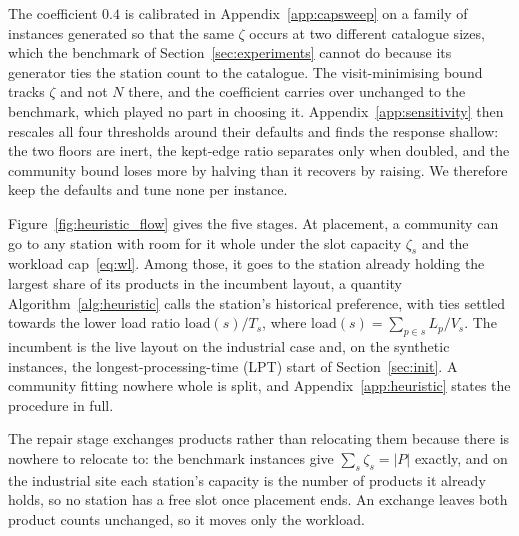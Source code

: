 \documentclass[]{interact}
\begin{document}
The coefficient $0.4$ is calibrated in Appendix~\ref{app:capsweep} on a family of instances generated so that the same $\zeta$ occurs at two different catalogue sizes, which the benchmark of Section~\ref{sec:experiments} cannot do because its generator ties the station count to the catalogue. The visit-minimising bound tracks $\zeta$ and not $N$ there, and the coefficient carries over unchanged to the benchmark, which played no part in choosing it. Appendix~\ref{app:sensitivity} then rescales all four thresholds around their defaults and finds the response shallow: the two floors are inert, the kept-edge ratio separates only when doubled, and the community bound loses more by halving than it recovers by raising. We therefore keep the defaults and tune none per instance.

Figure~\ref{fig:heuristic_flow} gives the five stages. At placement, a community can go to any station with room for it whole under the slot capacity $\zeta_s$ and the workload cap~\eqref{eq:wl}. Among those, it goes to the station already holding the largest share of its products in the incumbent layout, a quantity Algorithm~\ref{alg:heuristic} calls the station's historical preference, with ties settled towards the lower load ratio $\mathrm{load}(s)/T_s$, where $\mathrm{load}(s)=\sum_{p\in s}L_p/V_s$. The incumbent is the live layout on the industrial case and, on the synthetic instances, the longest-processing-time (LPT) start of Section~\ref{sec:init}. A community fitting nowhere whole is split, and Appendix~\ref{app:heuristic} states the procedure in full.

The repair stage exchanges products rather than relocating them because there is nowhere to relocate to: the benchmark instances give $\sum_s \zeta_s = |P|$ exactly, and on the industrial site each station's capacity is the number of products it already holds, so no station has a free slot once placement ends. An exchange leaves both product counts unchanged, so it moves only the workload.
\end{document}
